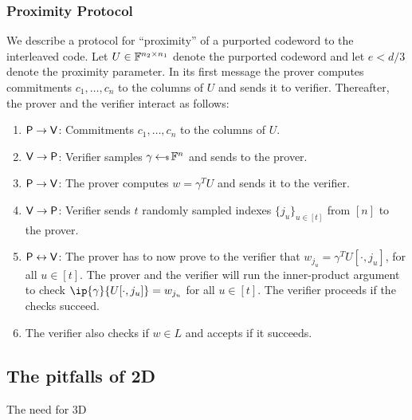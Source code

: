 \subsubsection{Proximity Protocol}\label{sec:proximity2D}
We describe a protocol for ``proximity'' of a purported codeword to the
interleaved code. Let $U\in \mathbb{F}^{n_2\times n_1}$ denote the purported codeword and let
$e< d/3$ denote the proximity parameter. 
In its first message the
prover computes commitments $c_1,\ldots,c_n$ to the columns of $U$ and
sends it to verifier. Thereafter, the prover and the verifier interact as
follows:
\begin{enumerate}[{\rm 1.}]
\item $\mathsf{P}\rightarrow \mathsf{V}$: Commitments $c_1,\ldots,c_n$ to the columns of $U$.
\item $\mathsf{V}\rightarrow \mathsf{P}$: Verifier samples $\gamma \hskip2.3pt{\gets\!\!\mbox{\tiny${\$}$\normalsize}}\, \mathbb{F}^n$ and sends to the prover.
\item $\mathsf{P}\rightarrow \mathsf{V}$: The prover computes $w=\gamma^T U$ and sends it to the verifier. 
\item $\mathsf{V}\rightarrow \mathsf{P}$: Verifier sends $t$ randomly sampled indexes $\{j_u\}_{u\in [t]}$ from $[n]$ to the prover.
\item $\mathsf{P}\leftrightarrow\mathsf{V}$: The prover has to now prove to the verifier that $w_{j_u} = \gamma^T U[\cdot, j_u]$, for all $u \in [t]$. The prover and the verifier will run the inner-product argument to check $\ip{\gamma}{U[\cdot, j_u]} = w_{j_u}$ for all $u \in [t]$. The verifier proceeds if the checks succeed.
\item The verifier also checks if  $w\in L$ and accepts if it succeeds.
\end{enumerate}

\subsection{The pitfalls of 2D}
The need for 3D